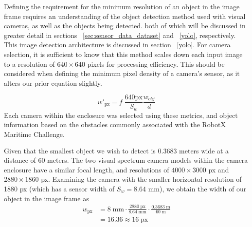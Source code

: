 \documentclass{erauthesis}
\begin{document}
Defining the requirement for the minimum resolution of an object in the image frame requires an understanding of the object detection method used with visual cameras, as well as the objects being detected. both of which will be discussed in greater detail in sections ~\ref{sec:sensor_data_dataset} and ~\ref{yolo}, respectively.
This image detection architecture is discussed in section ~\ref{yolo}.
For camera selection, it is sufficient to know that this method scales down each input image to a resolution of $640 \times 640$ pixels for processing efficiency.
This should be considered when defining the minimum pixel density of a camera's sensor, as it alters our prior equation slightly.

\begin{equation}
\mathit{w}'_{\text{px}} = f \; \frac{640 \text{px}}{S_w}\frac{\mathit{w}_{obj}}{d}
\end{equation}
Each camera within the enclosure was selected using these metrics, and object information based on the obstacles commonly associated with the RobotX Maritime Challenge. %

Given that the smallest object we wish to detect is $0.3683$ meters wide at a distance of 60 meters.
The two visual spectrum camera models within the camera enclosure have a similar focal length, and resolutions of $4000 \times 3000$ px and $2880 \times 1860$ px. Examining the camera with the smaller horizontal resolution of 1880 px (which has a sensor width of $S_{w} = 8.64$ mm), we obtain the width of our object in the image frame as
\begin{equation*}
\begin{split}
    \mathit{w}_{\text{px}} & = 8\;\text{mm} \cdot \frac{2880\;\text{px}}{8.64\;\text{mm}} \cdot \frac{0.3683\;\text{m}}{60\;\text{m}}\\
     & = 16.36 \approx 16 \;\text{px}
\end{split}
\end{equation*}
\end{document}
